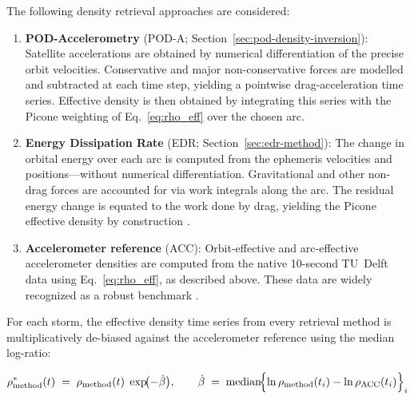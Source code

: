 \documentclass[draft]{agujournal2019}
\begin{document}
The following density retrieval approaches are considered:
\begin{enumerate}
  \item \textbf{POD-Accelerometry} (POD-A; Section~\ref{sec:pod-density-inversion}):
        Satellite accelerations are obtained by numerical differentiation of
        the precise orbit velocities. Conservative and major non-conservative
        forces are modelled and subtracted at each time step, yielding a
        pointwise drag-acceleration time series. Effective density is then
        obtained by integrating this series with the Picone weighting of
        Eq.~\eqref{eq:rho_eff} over the chosen arc.

  \item \textbf{Energy Dissipation Rate} (EDR; Section~\ref{sec:edr-method}):
        The change in orbital energy over each arc is computed from the
        ephemeris velocities and positions—without numerical differentiation.
        Gravitational and other non-drag forces are accounted for via work
        integrals along the arc. The residual energy change is equated to
        the work done by drag, yielding the Picone effective density by
        construction
        \cite{Sutton2021TowardSatellites, Fitzpatrick2024ApplyingSatellite}.

  \item \textbf{Accelerometer reference} (ACC):
        Orbit-effective and arc-effective accelerometer densities are computed
        from the native 10-second TU~Delft data
        \cite{Siemes2023NewGRACE-FO} using Eq.~\eqref{eq:rho_eff}, as
        described above. These data are widely recognized as a robust
        benchmark \cite{March2021, Mehta2017, Gondelach2020,
        Kuang2014MeasuringData, Emmert2015ThermosphericReview}.
\end{enumerate}

For each storm, the effective density time series from every retrieval method
is multiplicatively de-biased against the accelerometer reference using the
median log-ratio:
\begin{linenomath*}
\begin{equation}
\label{eq:debias}
\rho_{\text{method}}^{\ast}(t)
\;=\;
\rho_{\text{method}}(t)\;\exp\!\bigl(-\hat{\beta}\bigr),
\qquad
\hat{\beta}
\;=\;
\operatorname{median}\!\Bigl\{
  \ln\rho_{\text{method}}(t_{i}) - \ln\rho_{\text{ACC}}(t_{i})
\Bigr\}_{i}
\end{equation}
\end{linenomath*}
\end{document}
